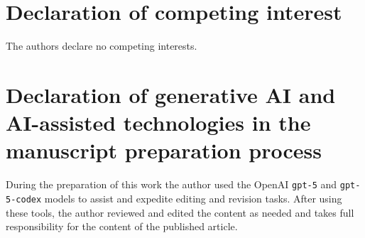 \documentclass[review]{elsarticle}
\begin{document}
\section*{Declaration of competing interest}
The authors declare no competing interests.

\section*{Declaration of generative AI and AI-assisted technologies in the manuscript preparation process}
During the preparation of this work the author used the OpenAI \texttt{gpt-5} and \texttt{gpt-5-codex} models to assist and expedite editing and revision tasks. After using these tools, the author reviewed and edited the content as needed and takes full responsibility for the content of the published article.



\end{document}
